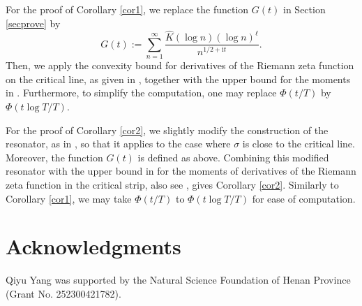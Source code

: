 \documentclass[12pt,reqno]{amsart}
\theoremstyle{definition}
\numberwithin{equation}{section}
\newcommand{\mit}{\mathrm{i}t}
\begin{document}
For the proof of Corollary \ref{cor1}, we replace the function \(G(t)\) in Section \ref{secprove} by
\[
G(t) := \sum_{n=1}^\infty \frac{\widehat{K}(\log n)(\log n)^\ell}{n^{1/2+\mit}}.
\]
Then, we apply the convexity bound for derivatives of the Riemann zeta function on the critical line, as given in \cite[Lemma 2]{yang2022extreme}, together with the upper bound for the moments in \cite[Theorem A\textsuperscript{\(\prime\prime\)}]{Ingham1926PLMS}. Furthermore, to simplify the computation, one may replace \(\Phi(t/T)\) by \(\Phi(t\log T/T)\).
\par
For the proof of Corollary \ref{cor2}, we slightly modify the construction of the resonator, as in \cite[Section 3.1]{YANG2026jmaa}, so that it applies to the case where \(\sigma\) is close to the critical line. Moreover, the function \(G(t)\) is defined as above. Combining this modified resonator with the upper bound in \cite[Lemma 4]{yang2022extreme} for the moments of derivatives of the Riemann zeta function in the critical strip, also see \cite{Ingham1926PLMS}, gives Corollary \ref{cor2}. Similarly to Corollary \ref{cor1}, we may take \(\Phi(t/T)\) to \(\Phi(t\log T/T)\) for ease of computation.

\section*{Acknowledgments}
Qiyu Yang was supported by the Natural Science Foundation of Henan Province (Grant No. 252300421782).
	
	
    
\end{document}
